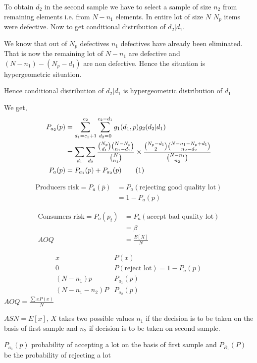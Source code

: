 \documentclass[oneside,11pt,pdftex]{book}%
\numberwithin{equation}{section}
\newcommand\numberthis{\addtocounter{equation}{1}\tag{\theequation}}
\numberwithin{section}{chapter}
\numberwithin{equation}{chapter}
\begin{document}
To obtain $ d_2 $ in the second sample we have to select a sample of size $ n_2$ from remaining elements i.e. from $ N-n_1 $ elements. In entire lot of size $ N $ $ N_p $ items were defective. Now to get conditional distribution of $ d_2|d_1 $.

We know that out of $ N_p $ defectives $ n_1 $ defectives have already been eliminated. That is now the remaining lot of $ N-n_1 $ are defective and $ (N-n_1)-(N_p-d_1) $ are non defective. Hence the situation is hypergeometric situation.

Hence conditional distribution of $ d_2|d_1 $ is hypergeometric distribution of $ d_1 $


We get,
\begin{align*}
	P_{a_2}(p)&=\sum_{d_1=c_1+1}^{c_2}\sum_{d_2=0}^{c_2-d_1} g_1(d_1,p) g_2(d_2|d_1)\\
	&=\sum_{d_1}\sum_{d_2} \frac{\binom{N_p}{d_1}\binom{N-N_p}{n_1-d_1}}{\binom{N}{n_1}} \times \frac{\binom{N_p-d_1}{2}\binom{N-n_1-N_p+d_1}{n_2-d_2}}{\binom{N-n_1}{n_2}}\\
	P_a(p)&=P_{a_1}(p)+P_{a_2}(p)\numberthis
\end{align*}

\begin{align*}
	\text{Producers risk}=P_a(\overline{p})&=P_a(\text{rejecting good quality lot})\\
	&=1-P_a(p)
\end{align*}

\begin{align*}
	\text{Consumers risk}=P_o(p_t)&=P_a(\text{accept bad quality lot})\\
	&=\beta\\
	AOQ&=\frac{E[X]}{N}
\end{align*}

\[ \begin{matrix}
	x & P(x)\\
	0 & P(\text{reject lot})=1-P_a(p)\\
	(N-n_1)p & P_{a_1}(p)\\
	(N-n_1-n_2)P & P_{a_2}(p)
	
\end{matrix} \]
$ AOQ=\frac{\sum xP(x)}{N}$


$ ASN=E[x] $, $ X $ takes two possible values $ n_1 $ if the decision is to be taken on the basis of first sample and $ n_2 $ if decision is to be taken on second sample. 

$ P_{a_1}(p) $ probability of accepting a lot on the basis of first sample and $ P_{R_1} (P)$ be the probability of rejecting a lot 
\end{document}

